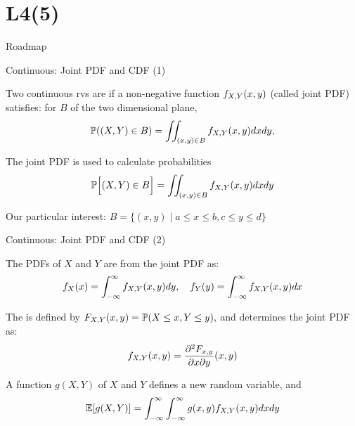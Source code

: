 \section{L4(5)}
\begin{frame}{Roadmap}

\plitemsep 0.1in
\bce[(1)]
\item {}

\item {}

\item {}

\item {}

\item {}

\item {}

\ece
\end{frame}


\begin{frame}{Continuous: Joint PDF and CDF (1)}

\mycolorbox
{
Two continuous rvs are  if a non-negative function $f_{X,Y}(x,y)$ (called joint PDF) satisfies: for  $B$ of the two dimensional plane,
$$
\mathbb{P}( (X,Y) \in B ) = \iint_{(x,y) \in B} f_{X,Y}(x,y) dx dy,
$$
\vspace{-0.3cm}
}

\plitemsep 0.1in
\bce
\item<3-> The joint PDF is used to calculate probabilities
$$\mathbb{P}\Bigl[ (X,Y) \in B \Bigr] = \iint_{(x,y) \in B} f_{X,Y}(x,y) dx dy$$

Our particular interest: $B = \{(x,y) \mid a \le x \le b, c \le y \le d \}$
\ece

\end{frame}

\begin{frame}{Continuous: Joint PDF and CDF (2)}

\plitemsep 0.1in
\bce
\item<1->[2.] The  PDFs of $X$ and $Y$ are from the joint PDF as:
$$
f_X(x) = \int_{-\infty}^\infty f_{X,Y}(x,y) dy, \quad f_Y(y) = \int_{-\infty}^\infty f_{X,Y}(x,y) dx
$$

\item<2->[3.] The  is defined by $F_{X,Y}(x,y) = \mathbb{P}( X \le x, Y \le y ),$ and determines the joint PDF as:
$$
f_{X,Y}(x,y) = \frac{\partial^2 F_{x,y}}{\partial x \partial y} (x,y)
$$

\item<3->[4.] A function $g(X,Y)$ of $X$ and $Y$ defines a new random variable, and
$$
\mathbb{E}[ g(X,Y) ] = \int_{-\infty}^\infty \int_{-\infty}^\infty g(x,y) f_{X,Y}(x,y) dx dy
$$
\ece

\end{frame}

